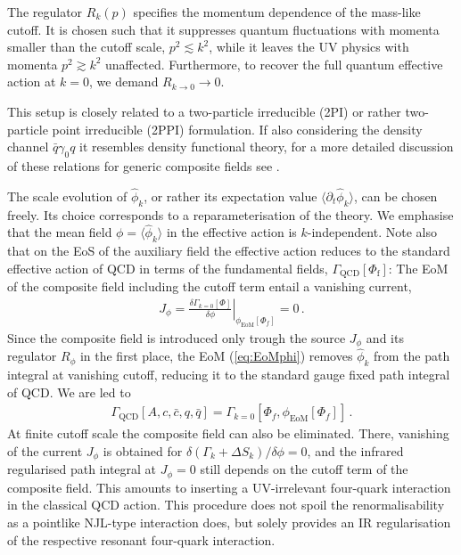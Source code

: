 \documentclass[%
reprint,
superscriptaddress,
showpacs,preprintnumbers,
 amsmath,amssymb,
 aps,
prd,
]{revtex4-1}
\def\eq#1{(\ref{#1})}
\begin{document}
%
The regulator $R_k(p)$ specifies the momentum dependence of the
mass-like cutoff. It is chosen such that it suppresses quantum
fluctuations with momenta smaller than the cutoff scale,
$p^2\lesssim k^2$, while it leaves the UV physics with momenta
$p^2\gtrsim k^2$ unaffected. Furthermore, to recover the full quantum
effective action at $k = 0$, we demand
$R_{k\rightarrow 0} \rightarrow 0$.

This setup is closely related to a two-particle irreducible (2PI) or
rather two-particle point irreducible (2PPI) formulation. If also
considering the density channel $\bar q\gamma_0 q$ it resembles
density functional theory, for a more detailed discussion of these
relations for generic composite fields see \cite{Pawlowski:2005xe}. 

The scale evolution of $\hat\phi_k$, or rather its expectation value
$\langle \partial_t \hat\phi_k \rangle $, can be chosen freely. Its
choice corresponds to a reparameterisation of the theory. We emphasise
that the mean field $\phi =\langle \hat\phi_k\rangle$ in the effective
action is $k$-independent. Note also that on the EoS of the auxiliary
field the effective action reduces to the standard effective action of
QCD in terms of the fundamental fields,
$\Gamma_{\textrm{QCD}}[\Phi_\textrm{f}]$: The EoM of the composite
field including the cutoff term entail a vanishing current,
%
\begin{align}\label{eq:EoMphi}
  J_\phi=  \left. \frac{\delta\Gamma_{k=0}[\Phi]}{
  \delta\phi} \right|_{\phi_\textrm{EoM}[\Phi_f]}=0\,.
\end{align}
%
Since the composite field is introduced only trough the source
$J_\phi$ and its regulator $R_\phi$ in the first place, the EoM
\eq{eq:EoMphi} removes $\hat\phi_k$ from the path integral at
vanishing cutoff, reducing it to the standard gauge fixed path
integral of QCD. We are led to
%
\begin{align}\label{eq:GQCD=GDynHad}
  \Gamma_\textrm{QCD}[A,c,\bar c,q,\bar q]=
  \Gamma_{k=0}[\Phi_{f},\phi_\textrm{EoM}[\Phi_f]]\,.
\end{align}
%
At finite cutoff scale the composite field can also be eliminated.
There, vanishing of the current $J_\phi$ is obtained for
$\delta(\Gamma_k+\Delta S_k)/ \delta\phi =0$, and the infrared
regularised path integral at $J_\phi=0$ still depends on the cutoff
term of the composite field. This amounts to inserting a UV-irrelevant
four-quark interaction in the classical QCD action. This procedure
does not spoil the renormalisability as a pointlike NJL-type
interaction does, but solely provides an IR regularisation of the
respective resonant four-quark interaction.
\end{document}
